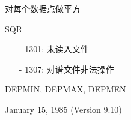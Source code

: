 \label{cmd:sqr}

对每个数据点做平方

SQR

\begin{itemize}
\item[-]1301: 未读入文件
\item[-]1307: 对谱文件非法操作
\end{itemize}

DEPMIN, DEPMAX, DEPMEN

January 15, 1985 (Version 9.10)
